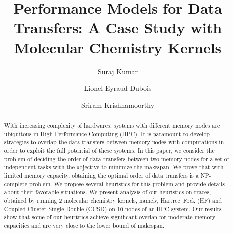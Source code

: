 \documentclass[sigconf]{acmart}
\begin{document}
	
	\title{Performance Models for Data Transfers: A Case Study with Molecular Chemistry Kernels}
	
	\author{Suraj Kumar}
	
	
	
	\author{Lionel Eyraud-Dubois}
	
	\author{Sriram Krishnamoorthy}
	
	\renewcommand{\shortauthors}{Kumar and Eyraud-Dubois, et al.}
	
	
	\begin{abstract}
		With increasing complexity of hardwares, systems with different memory nodes are ubiquitous in High Performance Computing (HPC). It is paramount to develop strategies to overlap the data transfers between memory nodes with computations in order to exploit the full potential of these systems. In this paper, we consider the problem of deciding the order of data transfers between two memory nodes for a set of independent tasks with the objective to minimize the makespan. We prove that with limited memory capacity, obtaining the optimal order of data transfers is a NP-complete problem. We propose several heuristics for this problem and provide details about their favorable situations. We present analysis of our heuristics on traces, obtained by running 2 molecular chemistry kernels, namely, Hartree–Fock (HF) and Coupled Cluster Single Double (CCSD) on 10 nodes of an HPC system. Our results show that some of our heuristics achieve significant overlap for moderate memory capacities and are very close to the lower bound of makespan.
	\end{abstract}
	
\end{document}
